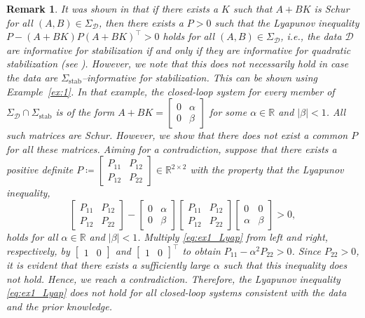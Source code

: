 \documentclass[9pt,shortpaper,twoside,web]{ieeecolor}
\newtheorem{remark}[theorem]{Remark}
\begin{document}
\begin{remark}
It was shown in \cite[Sec. IV]{van2021matrix} that if there exists a $K$ such that $A+BK$ is Schur for all $(A,B)\in\Sigma_\mathcal{D}$, then there exists a $P>0$ such that the Lyapunov inequality \mbox{$P-(A+BK) P(A+BK)^\top>0$} holds for all $(A,B)\in\Sigma_\mathcal{D}$, i.e., the data $\mathcal{D}$ are informative for stabilization \emph{if and only if} they are informative for quadratic stabilization (see \cite[Def. 2]{van2021matrix}). However, we note that this does not necessarily hold in case the data are \mbox{$\Sigma_\text{stab}$--informative} for stabilization. This can be shown using Example~\ref{ex:1}. In that example, the closed-loop system for every member of $\Sigma_\mathcal{D}\cap\Sigma_\text{stab}$ is of the form $A+BK=\begin{bmatrix}
0 & \alpha \\
0 & \beta
\end{bmatrix}$ for some $\alpha\in\mathbb{R}$ and $|\beta|<1$. All such matrices are Schur. However, we show that there does not exist a common $P$ for all these matrices. Aiming for a contradiction, suppose that there exists a positive definite \mbox{$P\coloneqq\begin{bmatrix}
P_{11} & P_{12} \\
P_{12} & P_{22}
\end{bmatrix}\in\mathbb{R}^{2\times 2}$} with the property that the Lyapunov inequality,
\begin{equation}
\label{eq:ex1_Lyap}
\begin{bmatrix}
P_{11} & P_{12} \\
P_{12} & P_{22}
\end{bmatrix}-\begin{bmatrix}
0 & \alpha \\
0 & \beta
\end{bmatrix}\begin{bmatrix}
P_{11} & P_{12} \\
P_{12} & P_{22}
\end{bmatrix}\begin{bmatrix}
0 & 0 \\
\alpha & \beta
\end{bmatrix}
>0,
\end{equation}
holds for all $\alpha\in\mathbb{R}$ and $|\beta|<1$. Multiply \eqref{eq:ex1_Lyap} from left and right, respectively, by $\begin{bmatrix}
1 & 0
\end{bmatrix}$ and $\begin{bmatrix}
1 & 0
\end{bmatrix}^\top$ to obtain \mbox{$P_{11}-\alpha^2 P_{22}>0$}. Since $P_{22}>0$, it is evident that there exists a sufficiently large $\alpha$ such that this inequality does not hold. Hence, we reach a contradiction. Therefore, the Lyapunov inequality \eqref{eq:ex1_Lyap} does not hold for all closed-loop systems consistent with the data and the prior knowledge.
\end{remark}
\end{document}
